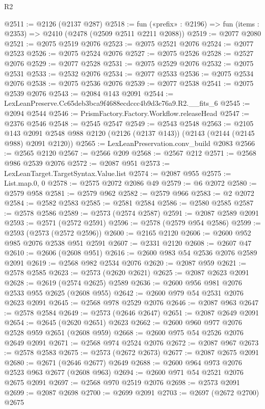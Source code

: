 \begin{lexlean}{R2}
\begin{coremodule}
@2511 := @2126 (@2137 @287)
@2518 := fun («prefix» : @2196) => fun (items : @2353) => @2410 (@2478 (@2509 @2511 @2211 @2088))
@2519 := @2077 @2080
@2521 := @2075 @2519 @2076
@2523 := @2075 @2521 @2076
@2524 := @2077 @2523
@2526 := @2075 @2524 @2076
@2527 := @2075 @2526
@2528 := @2527 @2076
@2529 := @2077 @2528
@2531 := @2075 @2529 @2076
@2532 := @2075 @2531
@2533 := @2532 @2076
@2534 := @2077 @2533
@2536 := @2075 @2534 @2076
@2538 := @2075 @2536 @2076
@2539 := @2077 @2538
@2541 := @2075 @2539 @2076
@2543 := @2084 @143 @2091
@2544 := LexLeanPreserve.Cc65deb3bca9f4688ecdccc4b9d3c76a9.R2.__fits_6
@2545 := @2094 @2544
@2546 := PrismFactory.Factory.Workflow.releaseHead
@2547 := @2376 @2546
@2548 := @2545 @2547
@2549 := @2543 @2548
@2563 := @2105
    @143
    @2091
    @2548
    @988
    @2120
    (@2126 (@2137 @143))
    (@2143 (@2144 (@2145 @988) @2091 @2120))
@2565 := LexLeanPreservation.conv_build @2083
@2566 := @2565 @2120
@2567 := @2566 @209
@2568 := @2567 @212
@2571 := @2568 @986 @2539 @2076
@2572 := @2087 @951
@2573 := LexLeanTarget.TargetSyntax.Value.list
@2574 := @2087 @955
@2575 := List.map.{0, 0}
@2578 := @2575 @2072 @2086 @49
@2579 := @6 @2072
@2580 := @2579 @958
@2581 := @2579 @962
@2582 := @2579 @966
@2583 := @2 @2072
@2584 := @2582 @2583
@2585 := @2581 @2584
@2586 := @2580 @2585
@2587 := @2578 @2586
@2589 := @2573 (@2574 @2587)
@2591 := @2087 @2589 @2091
@2593 := @2571 (@2572 @2591)
@2596 := @2578 (@2579 @954 @2586)
@2599 := @2593 (@2573 (@2572 @2596))
@2600 := @2165 @2120
@2606 := @2600 @952 @985 @2076 @2538 @951 @2591
@2607 := @2331 @2120
@2608 := @2607 @47
@2610 := @2606 (@2608 @951)
@2616 := @2600 @983 @54 @2536 @2076 @2589 @2091
@2619 := @2568 @982 @2534 @2076
@2620 := @2087 @959
@2621 := @2578 @2585
@2623 := @2573 (@2620 @2621)
@2625 := @2087 @2623 @2091
@2628 := @2619 (@2574 @2625) @2589
@2636 := @2600 @956 @981 @2076 @2533 @955 @2625 (@2608 @955)
@2642 := @2600 @979 @54 @2531 @2076 @2623 @2091
@2645 := @2568 @978 @2529 @2076
@2646 := @2087 @963
@2647 := @2578 @2584
@2649 := @2573 (@2646 @2647)
@2651 := @2087 @2649 @2091
@2654 := @2645 (@2620 @2651) @2623
@2662 := @2600 @960 @977 @2076 @2528 @959 @2651 (@2608 @959)
@2668 := @2600 @975 @54 @2526 @2076 @2649 @2091
@2671 := @2568 @974 @2524 @2076
@2672 := @2087 @967
@2673 := @2578 @2583
@2675 := @2573 (@2672 @2673)
@2677 := @2087 @2675 @2091
@2680 := @2671 (@2646 @2677) @2649
@2688 := @2600 @964 @973 @2076 @2523 @963 @2677 (@2608 @963)
@2694 := @2600 @971 @54 @2521 @2076 @2675 @2091
@2697 := @2568 @970 @2519 @2076
@2698 := @2573 @2091
@2699 := @2087 @2698
@2700 := @2699 @2091
@2703 := @2697 (@2672 @2700) @2675

\end{coremodule}
\end{lexlean}
